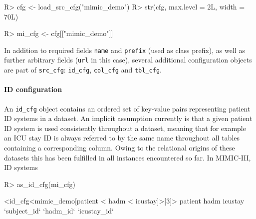 \documentclass[
]{jss}
\begin{document}
\begin{CodeChunk}
\begin{CodeInput}
R> cfg <- load_src_cfg("mimic_demo")
R> str(cfg, max.level = 2L, width = 70L)
\end{CodeInput}
\begin{CodeOutput}
List of 1
 $ mimic_demo:List of 6
  ..$ name   : chr "mimic_demo"
  ..$ prefix : chr [1:2] "mimic_demo" "mimic"
  ..$ id_cfg : id_cfg [1:3] `subject_id`, `hadm_id`, `icustay_id`
  ..$ col_cfg: col_cfg [1:25] [0, 0, 5, 0, 1], [0, 1, 6, 0, 1], [1, 0, 0...
  ..$ tbl_cfg: tbl_cfg [1:25] [?? x 19; 1], [?? x 24; 1], [?? x 4; 1], [...
  ..$ extra  :List of 1
  ..- attr(*, "class")= chr [1:3] "mimic_demo_cfg" "mimic_cfg" "src_cfg"
\end{CodeOutput}
\begin{CodeInput}
R> mi_cfg <- cfg[["mimic_demo"]]
\end{CodeInput}
\end{CodeChunk}

In addition to required fields \texttt{name} and \texttt{prefix} (used
as class prefix), as well as further arbitrary fields (\texttt{url} in
this case), several additional configuration objects are part of
\texttt{src\_cfg}: \texttt{id\_cfg}, \texttt{col\_cfg} and
\texttt{tbl\_cfg}.

\hypertarget{id-configuration}{%
\paragraph{ID configuration}\label{id-configuration}}

An \texttt{id\_cfg} object contains an ordered set of key-value pairs
representing patient ID systems in a dataset. An implicit assumption
currently is that a given patient ID system is used consistently
throughout a dataset, meaning that for example an ICU stay ID is always
referred to by the same name throughout all tables containing a
corresponding column. Owing to the relational origins of these datasets
this has been fulfilled in all instances encountered so far. In
MIMIC-III, ID systems

\begin{CodeChunk}
\begin{CodeInput}
R> as_id_cfg(mi_cfg)
\end{CodeInput}
\begin{CodeOutput}
<id_cfg<mimic_demo[patient < hadm < icustay]>[3]>
     patient         hadm      icustay 
`subject_id`    `hadm_id` `icustay_id` 
\end{CodeOutput}
\end{CodeChunk}
\end{document}
